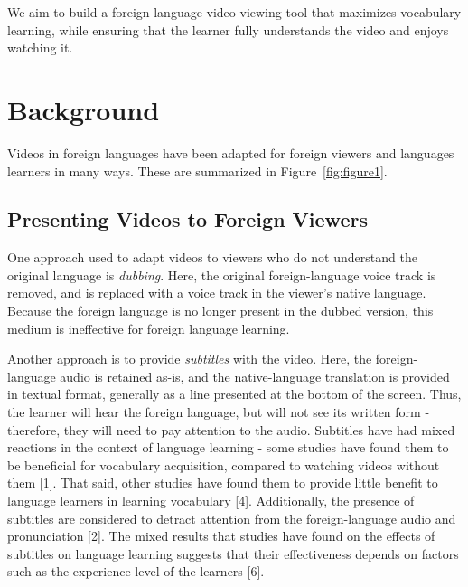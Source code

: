\documentclass{sigchi}
\begin{document}
We aim to build a foreign-language video viewing tool
that maximizes vocabulary learning, while ensuring that the learner
fully understands the video and enjoys watching it.

\section{Background}

Videos in foreign languages have been adapted for foreign viewers and languages learners in many ways. These are summarized in Figure~\ref{fig:figure1}.



\subsection{Presenting Videos to Foreign Viewers}

One approach used to adapt videos to viewers who do not understand the original language is \emph{dubbing}. Here, the original foreign-language voice track is removed, and is replaced with a voice track in the viewer's native language.
Because the foreign language is no longer present in the dubbed version, this medium is ineffective for foreign language learning.

Another approach is to provide \emph{subtitles} with the video. Here, the foreign-language audio is retained as-is, and the native-language translation is provided in textual format, generally as a line presented at the bottom of the screen.
Thus, the learner will hear the foreign language, but will not see its written form - therefore, they will need to pay attention to the audio.
Subtitles have had mixed reactions in the context of language learning - some studies have found them to be beneficial for vocabulary acquisition, compared to watching videos without them [1].
That said, other studies have found them to provide little benefit to language learners in learning vocabulary [4]. Additionally, the presence of subtitles are considered to detract attention from the foreign-language audio and pronunciation [2].
The mixed results that studies have found on the effects of subtitles on language learning suggests that their effectiveness depends on factors such as the experience level of the learners [6].
\end{document}
